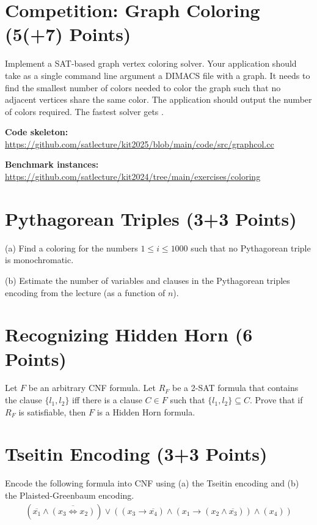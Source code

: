 \documentclass[a4paper]{article}
\begin{document}

\section{Competition: Graph Coloring (5(+7) Points)}

Implement a SAT-based graph vertex coloring solver.
Your application should take as a single command line argument a DIMACS file with a graph.
It needs to find the smallest number of colors needed to color the graph such that no adjacent vertices share the same color.
The application should output the number of colors required.
The fastest solver gets .

\vspace*{3mm}
\noindent
\textbf{Code skeleton:} \url{https://github.com/satlecture/kit2025/blob/main/code/src/graphcol.cc}

\noindent
\textbf{Benchmark instances:} \url{https://github.com/satlecture/kit2024/tree/main/exercises/coloring}

\section{Pythagorean Triples (3+3 Points)}

(a) Find a coloring for the numbers $1 \leq i \leq 1000$ such that no Pythagorean triple is monochromatic.

\noindent
(b) Estimate the number of variables and clauses in the Pythagorean triples encoding from the lecture (as a function of $n$).

\section{Recognizing Hidden Horn (6 Points)}

Let $F$ be an arbitrary CNF formula.
Let $R_F$ be a 2-SAT formula that contains the clause $\{l_1, l_2\}$ iff there is a clause $C \in F$ such that $\{l_1,l_2\} \subseteq C$.
Prove that if $R_F$ is satisfiable, then $F$ is a Hidden Horn formula.

\section{Tseitin Encoding (3+3 Points)}

Encode the following formula into CNF using (a) the Tseitin encoding and (b) the Plaisted-Greenbaum encoding.
\begin{align*}
(\overline{x_1} \wedge \overline{(x_3 \Leftrightarrow x_2)}) \vee ((x_3 \rightarrow \overline{x_4}) \wedge (x_1 \rightarrow (x_2 \wedge \overline{x_3})) \wedge (x_4))
\end{align*}
\end{document}

